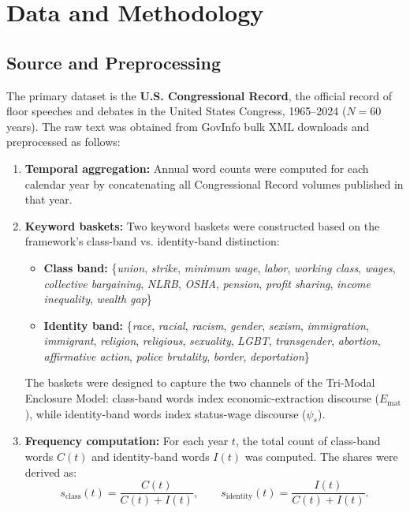 \section{Data and Methodology}

\subsection{Source and Preprocessing}

The primary dataset is the \textbf{U.S. Congressional Record}, the official record of floor speeches and debates in the United States Congress, 1965--2024 ($N = 60$ years). The raw text was obtained from GovInfo bulk XML downloads and preprocessed as follows:

\begin{enumerate}
    \item \textbf{Temporal aggregation:} Annual word counts were computed for each calendar year by concatenating all Congressional Record volumes published in that year.
    \item \textbf{Keyword baskets:} Two keyword baskets were constructed based on the framework's class-band vs. identity-band distinction:
    \begin{itemize}
        \item \textbf{Class band:} \{\textit{union}, \textit{strike}, \textit{minimum wage}, \textit{labor}, \textit{working class}, \textit{wages}, \textit{collective bargaining}, \textit{NLRB}, \textit{OSHA}, \textit{pension}, \textit{profit sharing}, \textit{income inequality}, \textit{wealth gap}\}
        \item \textbf{Identity band:} \{\textit{race}, \textit{racial}, \textit{racism}, \textit{gender}, \textit{sexism}, \textit{immigration}, \textit{immigrant}, \textit{religion}, \textit{religious}, \textit{sexuality}, \textit{LGBT}, \textit{transgender}, \textit{abortion}, \textit{affirmative action}, \textit{police brutality}, \textit{border}, \textit{deportation}\}
    \end{itemize}
    The baskets were designed to capture the two channels of the Tri-Modal Enclosure Model: class-band words index economic-extraction discourse ($E_{\text{mat}}$), while identity-band words index status-wage discourse ($\psi_s$).
    \item \textbf{Frequency computation:} For each year $t$, the total count of class-band words $C(t)$ and identity-band words $I(t)$ was computed. The shares were derived as:
    \begin{equation}\label{eq:21.3-share-definitions}
    s_{\text{class}}(t) = \frac{C(t)}{C(t) + I(t)}, \qquad s_{\text{identity}}(t) = \frac{I(t)}{C(t) + I(t)}.
    \end{equation}
\end{enumerate}

